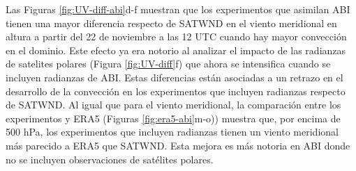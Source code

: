 \documentclass[12pt,oneside,a4paper]{reedthesis}
\begin{document}
Las Figuras \ref{fig:UV-diff-abi}d-f muestran que los experimentos que asimilan ABI tienen una mayor diferencia respecto de SATWND en el viento meridional en altura a partir del 22 de noviembre a las 12 UTC cuando hay mayor convección en el dominio. Este efecto ya era notorio al analizar el impacto de las radianzas de satelites polares (Figura \ref{fig:UV-diff}f) que ahora se intensifica cuando se incluyen radianzas de ABI. Estas diferencias están asociadas a un retrazo en el desarrollo de la convección en los experimentos que incluyen radianzas respecto de SATWND. Al igual que para el viento meridional, la comparación entre los experimentos y ERA5 (Figuras \ref{fig:era5-abi}m-o)) muestra que, por encima de 500 hPa, los experimentos que incluyen radianzas tienen un viento meridional más parecido a ERA5 que SATWND. Esta mejora es más notoria en ABI donde no se incluyen observaciones de satélites polares.
\end{document}
